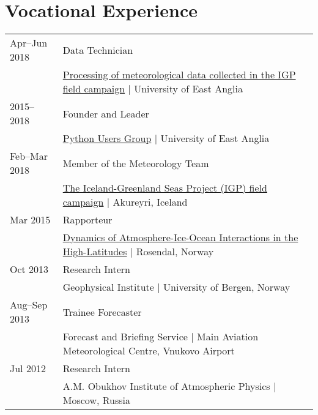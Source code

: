 \documentclass[a4paper, 11pt]{article}
\begin{document}
\section{Vocational Experience}
\begin{tabularx}{\linewidth}{@{}l X@{}}
Apr--Jun 2018 & Data Technician \\ & \href{https://github.com/IGPResearch}{Processing of meteorological data collected in the IGP field campaign} | University of East Anglia \\
2015--2018 & Founder and Leader \\ & \href{https://ueapy.github.io/}{Python Users Group} | University of East Anglia \\
Feb--Mar 2018 & Member of the Meteorology Team \\ & \href{https://twitter.com/igpresearch}{The Iceland-Greenland Seas Project (IGP) field campaign} | Akureyri, Iceland \\
Mar 2015 & Rapporteur \\ & \href{https://highlatdynamics.w.uib.no}{Dynamics of Atmosphere-Ice-Ocean Interactions in the High-Latitudes} | Rosendal, Norway \\
Oct 2013 & Research Intern \\ & Geophysical Institute | University of Bergen, Norway \\
Aug--Sep 2013 & Trainee Forecaster \\ & Forecast and Briefing Service | Main Aviation Meteorological Centre, Vnukovo Airport \\
Jul 2012 & Research Intern \\ & A.M. Obukhov Institute of Atmospheric Physics | Moscow, Russia \\
\end{tabularx}
\end{document}
